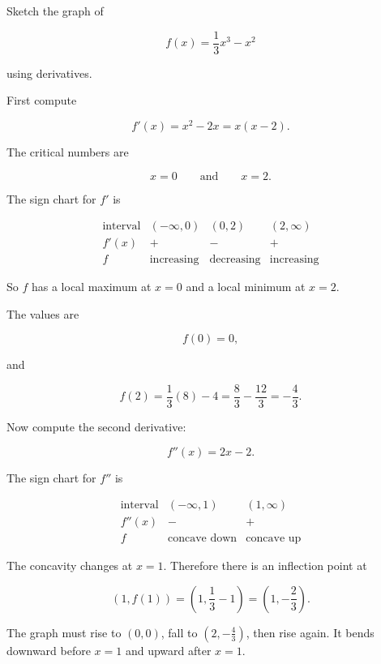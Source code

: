 Sketch the graph of

\[
f(x)=\frac13x^3-x^2
\]

using derivatives.

First compute

\[
f'(x)=x^2-2x=x(x-2).
\]

The critical numbers are

\[
x=0
\qquad\text{and}\qquad
x=2.
\]

The sign chart for \(f'\) is

\[
\begin{array}{c|ccc}
\text{interval} & (-\infty,0) & (0,2) & (2,\infty) \\ \hline
f'(x) & + & - & + \\[2pt]
f & \text{increasing} & \text{decreasing} & \text{increasing}
\end{array}
\]

So \(f\) has a local maximum at \(x=0\) and a local minimum at \(x=2\).

The values are

\[
f(0)=0,
\]

and

\[
f(2)=\frac13(8)-4=\frac83-\frac{12}{3}=-\frac43.
\]

Now compute the second derivative:

\[
f''(x)=2x-2.
\]

The sign chart for \(f''\) is

\[
\begin{array}{c|cc}
\text{interval} & (-\infty,1) & (1,\infty) \\ \hline
f''(x) & - & + \\[2pt]
f & \text{concave down} & \text{concave up}
\end{array}
\]

The concavity changes at \(x=1\).  Therefore there is an inflection point at

\[
\left(1,f(1)\right)
=
\left(1,\frac13-1\right)
=
\left(1,-\frac23\right).
\]

The graph must rise to \((0,0)\), fall to \(\left(2,-\frac43\right)\), then rise again.
It bends downward before \(x=1\) and upward after \(x=1\).

